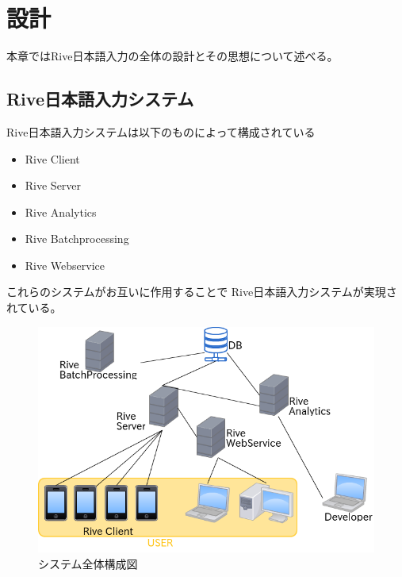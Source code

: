 \chapter{設計}
\label{chap:design}
本章ではRive日本語入力の全体の設計とその思想について述べる。

\newpage
\section{Rive日本語入力システム}
Rive日本語入力システムは以下のものによって構成されている
\begin{itemize}
  \item Rive Client
  \item Rive Server
  \item Rive Analytics
  \item Rive Batchprocessing
  \item Rive Webservice
\end{itemize}
これらのシステムがお互いに作用することで
Rive日本語入力システムが実現されている。
\begin{figure}[htbp]
  \begin{center}
    \includegraphics[width=12cm,bb=0 0 540 448]{images/systemstructure.png}
  \end{center}
  \caption{システム全体構成図}
  \label{fig:systemstructure}
\end{figure}

